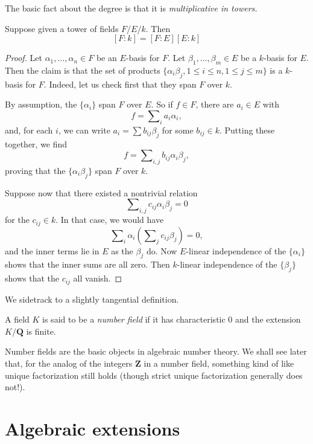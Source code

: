 \medskip\noindent
The basic fact about the degree is that it is {\it multiplicative in towers.}

\begin{lemma}[Multiplicativity]
\label{lemma-multiplicativity-degrees}
Suppose given a tower of fields $F/E/k$. Then
$$
[F:k] = [F:E][E:k]
$$
\end{lemma}

\begin{proof}
Let $\alpha_1, \ldots, \alpha_n \in F$ be an $E$-basis for $F$. Let
$\beta_1, \ldots, \beta_m \in E$ be a $k$-basis for $E$. Then the claim is
that the set of products
$\{\alpha_i \beta_j, 1 \leq i \leq n, 1 \leq j \leq m\}$
is a $k$-basis for $F$. Indeed, let us check first that they span $F$ over $k$.

\medskip\noindent
By assumption, the $\{\alpha_i\}$ span $F$ over $E$. So if
$f \in F$, there are $a_i \in E$ with
$$
f = \sum\nolimits_i a_i \alpha_i,
$$
and, for each $i$, we can write $a_i = \sum b_{ij} \beta_j$ for some
$b_{ij} \in k$. Putting these together, we find
$$
f = \sum\nolimits_{i,j} b_{ij} \alpha_i \beta_j,
$$
proving that the $\{\alpha_i \beta_j\}$ span $F$ over $k$.

\medskip\noindent
Suppose now that there existed a nontrivial relation
$$
\sum\nolimits_{i,j} c_{ij} \alpha_i \beta_j = 0
$$
for the $c_{ij} \in k$. In that case, we would have
$$
\sum\nolimits_i \alpha_i \left( \sum\nolimits_j c_{ij} \beta_j \right) = 0,
$$
and the inner terms lie in $E$ as the $\beta_j$ do. Now $E$-linear
independence of the $\{\alpha_i\}$ shows that the inner sums are all zero.
Then $k$-linear independence of the $\{\beta_j\}$ shows that the
$c_{ij}$ all vanish.
\end{proof}

\noindent
We sidetrack to a slightly tangential definition.

\begin{definition}
\label{definition-number-field}
A field $K$ is said to be a {\it number field} if it has characteristic
$0$ and the extension $K/\mathbf{Q}$ is finite.
\end{definition}

\noindent
Number fields are the basic objects in algebraic number theory. We shall see
later that,
for the analog of the integers $\mathbf{Z}$ in a number field, something kind
of like unique factorization still holds (though strict unique factorization
generally does not!).


\section{Algebraic extensions}
\label{section-algebraic-extensions}

